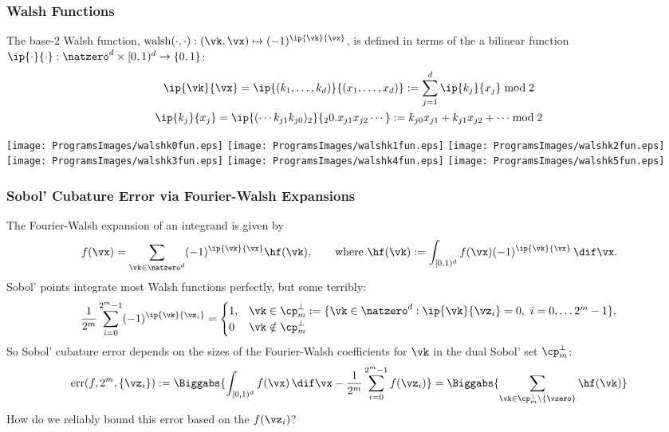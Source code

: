 \documentclass[10pt,compress]{beamer} %
\DeclareMathOperator{\err}{err}
\DeclareMathOperator{\walsh}{walsh}
\newcommand{\cube}{[0,1)^d}
\newcommand{\desall}{\{\vz_i\}}
\begin{document}
\begin{frame}\frametitle{Walsh Functions}
\vspace{-2ex}
The base-$2$ Walsh function, \alert{$\walsh(\cdot,\cdot) : (\vk,\vx) \mapsto (-1)^{\ip{\vk}{\vx}}$}, is defined in terms of the a bilinear function $\ip{\cdot}{\cdot}: \natzero^d \times \cube \to \{0,1\}$:
\vspace{-2ex}
\begin{gather*}
\ip{\vk}{\vx} = \ip{(k_1, \ldots, k_d) }{(x_1, \ldots, x_d)} := \sum_{j=1}^d \ip{k_j}{x_j} \bmod 2 \\
\ip{k_j}{x_j} = \ip{(\cdots k_{j1} k_{j0})_2}{{}_20.x_{j1} x_{j2} \cdots} := k_{j0} x_{j1} + k_{j1} x_{j2} + \cdots \bmod 2
\end{gather*}
\begin{center}
\texttt{[image: ProgramsImages/walshk0fun.eps]} \qquad
\texttt{[image: ProgramsImages/walshk1fun.eps]} \qquad
\texttt{[image: ProgramsImages/walshk2fun.eps]} \\
\texttt{[image: ProgramsImages/walshk3fun.eps]} \qquad
\texttt{[image: ProgramsImages/walshk4fun.eps]} \qquad
\texttt{[image: ProgramsImages/walshk5fun.eps]}
\end{center}
\end{frame}

\begin{frame}\frametitle{Sobol' Cubature Error via Fourier-Walsh Expansions}
The Fourier-Walsh expansion of an integrand is given by
\[
f(\vx) = \sum_{\vk \in \natzero^d} (-1)^{\ip{\vk}{\vx}} \hf(\vk) , \qquad \text{where } \hf(\vk) := \int_{\cube} f(\vx)(-1)^{\ip{\vk}{\vx}} \, \dif \vx.
\]
Sobol' points integrate most Walsh functions perfectly, but some terribly:
\[
\frac 1 {2^m} \sum_{i=0}^{2^m-1} (-1)^{\ip{\vk}{\vz_i}} =
\begin{cases} 1, & \vk \in \cp^{\perp}_m := \{ \vk \in \natzero^d : \ip{\vk}{\vz_i}=0, \ i=0, \ldots 2^{m}-1\}, \\
0 & \vk \notin \cp^{\perp}_m
\end{cases}
\]
So Sobol' cubature error depends on the sizes of the Fourier-Walsh coefficients for $\vk$ in the \alert{dual Sobol' set} $\cp^{\perp}_m$:
\[
\err(f,2^m,\desall) :=
\Biggabs{\int_{\cube} f(\vx) \, \dif \vx -  \frac 1 {2^m} \sum_{i=0}^{2^m-1} f(\vz_i)} =
\Biggabs{\sum_{\vk \in \cp^{\perp}_m\setminus\{\vzero\}} \hf(\vk)}
\]
\alert{How do we reliably bound this error based on the $f(\vz_i)$?}
\end{frame}
\end{document}

